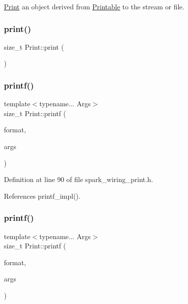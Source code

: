 \hyperlink{class_print}{Print} an object derived from \hyperlink{class_printable}{Printable} to the stream or file. 

\mbox{\label{class_print_aa4158dd94bc1741f92d99c427261d7c0}} 
\subsubsection{\texorpdfstring{print()}{print()}\hspace{0.1cm}{\footnotesize\ttfamily [19/19]}}
{\footnotesize\ttfamily size\+\_\+t Print\+::print (\begin{DoxyParamCaption}\item[{const \+\_\+\+\_\+\+Flash\+String\+Helper $\ast$}]{ }\end{DoxyParamCaption})}

\mbox{\label{class_print_a08a461c9fee5fd8f5795d6e9f61e3d5b}} 
\subsubsection{\texorpdfstring{printf()}{printf()}\hspace{0.1cm}{\footnotesize\ttfamily [1/2]}}
{\footnotesize\ttfamily template$<$typename... Args$>$ \\
size\+\_\+t Print\+::printf (\begin{DoxyParamCaption}\item[{const char $\ast$}]{format,  }\item[{Args...}]{args }\end{DoxyParamCaption})\hspace{0.3cm}{\ttfamily [inline]}}



Definition at line 90 of file spark\+\_\+wiring\+\_\+print.\+h.



References printf\+\_\+impl().

\mbox{\label{class_print_a08a461c9fee5fd8f5795d6e9f61e3d5b}} 
\subsubsection{\texorpdfstring{printf()}{printf()}\hspace{0.1cm}{\footnotesize\ttfamily [2/2]}}
{\footnotesize\ttfamily template$<$typename... Args$>$ \\
size\+\_\+t Print\+::printf (\begin{DoxyParamCaption}\item[{const char $\ast$}]{format,  }\item[{Args...}]{args }\end{DoxyParamCaption})\hspace{0.3cm}{\ttfamily [inline]}}



